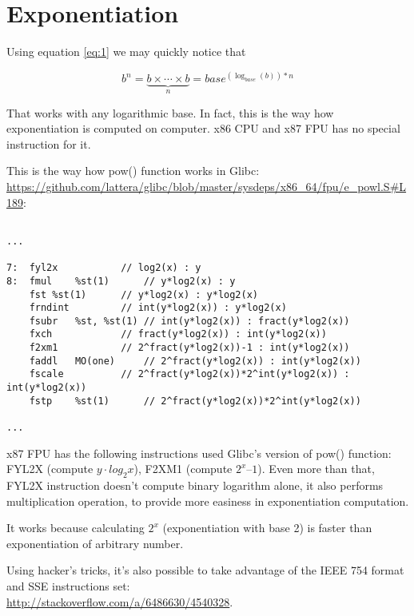 \section{Exponentiation}

Using equation \ref{eq:1} we may quickly notice that

\begin{equation}
b^n = \underbrace{b \times \cdots \times b}_n = base^{(\log_{base} (b))*n}
\end{equation}

That works with any logarithmic base.
In fact, this is the way how exponentiation is computed on computer.
x86 CPU and x87 FPU has no special instruction for it.

This is the way how pow() function works in Glibc: \url{https://github.com/lattera/glibc/blob/master/sysdeps/x86_64/fpu/e_powl.S\#L189}:\\

\begin{lstlisting}[caption={Glibc source code, fragment of the pow() function}]

...

7:	fyl2x			// log2(x) : y
8:	fmul	%st(1)		// y*log2(x) : y
	fst	%st(1)		// y*log2(x) : y*log2(x)
	frndint			// int(y*log2(x)) : y*log2(x)
	fsubr	%st, %st(1)	// int(y*log2(x)) : fract(y*log2(x))
	fxch			// fract(y*log2(x)) : int(y*log2(x))
	f2xm1			// 2^fract(y*log2(x))-1 : int(y*log2(x))
	faddl	MO(one)		// 2^fract(y*log2(x)) : int(y*log2(x))
	fscale			// 2^fract(y*log2(x))*2^int(y*log2(x)) : int(y*log2(x))
	fstp	%st(1)		// 2^fract(y*log2(x))*2^int(y*log2(x))

...

\end{lstlisting}

x87 FPU has the following instructions used Glibc's version of pow() function:
FYL2X (compute $y \cdot log_2 x$), F2XM1 (compute $2^x–1$).
Even more than that, FYL2X instruction doesn't compute binary logarithm alone, it also performs multiplication operation, 
to provide more easiness in exponentiation computation.

It works because calculating $2^x$ (exponentiation with base 2) is faster than exponentiation of arbitrary number.

Using hacker's tricks, it's also possible to take advantage of the IEEE 754 format and SSE instructions set:\\
\url{http://stackoverflow.com/a/6486630/4540328}.


